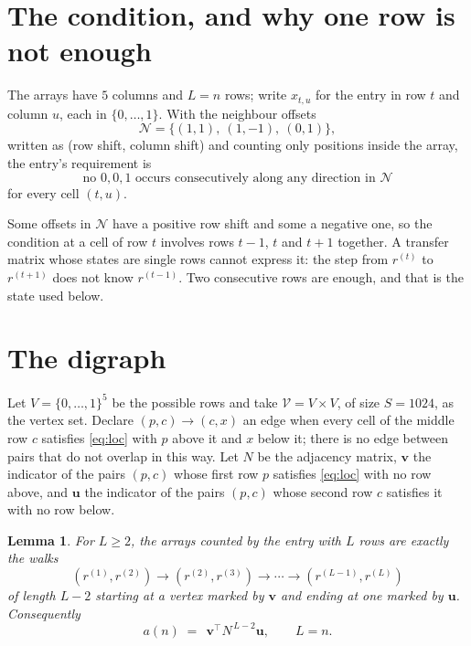 \documentclass[11pt,a4paper]{article}
\theoremstyle{plain}
\newtheorem{lemma}[theorem]{Lemma}
\theoremstyle{definition}
\begin{document}
\section{The condition, and why one row is not enough}

The arrays have $5$ columns and $L=n$ rows; write $x_{t,u}$ for the entry in
row $t$ and column $u$, each in $\{0,\dots,1\}$. With the neighbour offsets
\[
\mathcal N=\{(1,1),\ (1,-1),\ (0,1)\},
\]
written as (row shift, column shift) and counting only positions inside the array, the
entry's requirement is
\begin{equation}\label{eq:loc}
\text{no }0,0,1\text{ occurs consecutively along any direction in }\mathcal N
\end{equation}
for every cell $(t,u)$.

Some offsets in $\mathcal N$ have a positive row shift and some a negative one, so the
condition at a cell of row $t$ involves rows $t-1$, $t$ and $t+1$ together. A transfer
matrix whose states are single rows cannot express it: the step from $r^{(t)}$ to
$r^{(t+1)}$ does not know $r^{(t-1)}$. Two consecutive rows are enough, and that is
the state used below.

\section{The digraph}

Let $V=\{0,\dots,1\}^{5}$ be the possible rows and take
$\mathcal V=V\times V$, of size $S=1024$, as the vertex set. Declare $(p,c)\to(c,x)$ an edge
when every cell of the middle row $c$ satisfies \eqref{eq:loc} with $p$ above it and $x$
below it; there is no edge between pairs that do not overlap in this way. Let $N$ be the
adjacency matrix, $\mathbf{v}$ the indicator of the pairs $(p,c)$ whose first row $p$
satisfies \eqref{eq:loc} with no row above, and $\mathbf{u}$ the indicator of
the pairs $(p,c)$ whose second row $c$ satisfies it with no row below.

\begin{lemma}\label{lem:walk}
For $L\ge2$, the arrays counted by the entry with $L$ rows are exactly the walks
\[
(r^{(1)},r^{(2)})\to(r^{(2)},r^{(3)})\to\cdots\to(r^{(L-1)},r^{(L)})
\]
of length $L-2$ starting at a vertex marked by $\mathbf{v}$ and ending at one marked by
$\mathbf{u}$. Consequently
\[
a(n)\;=\;\,\mathbf{v}^{\!\top}N^{\,L-2}\mathbf{u},\qquad L=n .
\]
\end{lemma}
\end{document}
